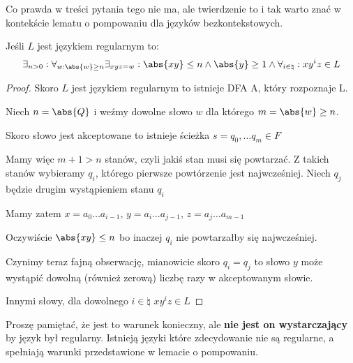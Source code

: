 Co prawda w treści pytania tego nie ma, ale twierdzenie to i tak warto znać w kontekście lematu o pompowaniu dla języków bezkontekstowych.

\begin{lemma}
	Jeśli \( L \) jest językiem regularnym to:
	\[
		\exists_{n > 0} : \forall_{w : \abs{w} \geq n} \exists_{xyz = w} : \abs{xy} \leq n \land \abs{y} \geq 1 \land \forall_{i \in \natural} : xy^iz \in L
	\]
\end{lemma}
\begin{proof}
	Skoro \( L \) jest językiem regularnym to istnieje DFA A, który rozpoznaje L.

	Niech \( n = \abs{Q} \) i weźmy dowolne słowo \( w \) dla którego \( m = \abs{w} \geq n \).

	Skoro słowo jest akceptowane to istnieje ścieżka \( s = q_0, \dots q_m \in F \)

	Mamy więc \( m + 1 > n \) stanów, czyli jakiś stan musi się powtarzać.
	Z takich stanów wybieramy \( q_i \), którego pierwsze powtórzenie jest najwcześniej. Niech \( q_j \) będzie drugim wystąpieniem stanu \( q_i \)

	Mamy zatem \( x = a_0\dots a_{i-1} \), \( y = a_i\dots a_{j-1} \), \( z = a_j \dots a_{m-1} \)

	Oczywiście \( \abs{xy} \leq n \) bo inaczej \( q_i \) nie powtarzałby się najwcześniej.

	Czynimy teraz fajną obserwację, mianowicie skoro  \( q_i = q_j \) to słowo \( y \) może wystąpić dowolną (również zerową) liczbę razy w akceptowanym słowie.

	Innymi słowy, dla dowolnego \( i \in \natural \) \( xy^iz \in L \)
\end{proof}

Proszę pamiętać, że jest to warunek konieczny, ale \textbf{nie jest on wystarczający} by język był regularny. Istnieją języki które zdecydowanie nie są regularne, a spełniają warunki przedstawione w lemacie o pompowaniu.